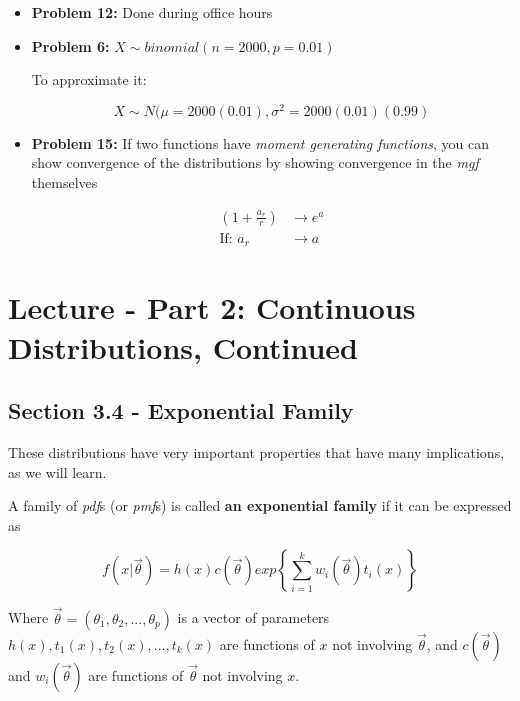 \documentclass{article}
\begin{document}
\begin{itemize}
    \item \textbf{Problem 12:} Done during office hours
    
    \item \textbf{Problem 6:} $X \sim binomial(n=2000,p=0.01)$
    
    To approximate it:
    
    \begin{equation*}
        X \sim N(\mu = 2000(0.01), \sigma^2 = 2000(0.01)(0.99)
    \end{equation*}
    
    \item \textbf{Problem 15:} If two functions have \textit{moment generating functions}, you can show convergence of the distributions by showing convergence in the \textit{mgf} themselves
    
    \begin{equation*}
        \begin{split}
            \left(1 + \frac{a_r}{r} \right) &\to e^a\\
           \text{If: } a_r &\to a
        \end{split}
    \end{equation*}
    
    \end{itemize}
    
    

\section{Lecture - Part 2: Continuous Distributions, Continued}

\subsection{Section 3.4 - Exponential Family}

These distributions have very important properties that have many implications, as we will learn.

A family of \textit{pdf}s (or \textit{pmf}s) is called \textbf{an exponential family} if it can be expressed as 

\begin{equation*}
    f(x|\overrightarrow{\theta}) = h(x) c(\overrightarrow{\theta}) exp\left\{ \sum_{i=1}^k w_i\left(\overrightarrow{\theta}\right)t_i(x) \right\}
\end{equation*}

Where $\overrightarrow{\theta} = (\theta_1, \theta_2,...,\theta_p)$ is a vector of parameters $h(x),t_1(x),t_2(x),...,t_k(x)$ are functions of $x$ not involving $\overrightarrow{\theta}$, and $c(\overrightarrow{\theta})$ and $w_i(\overrightarrow{\theta})$ are functions of $\overrightarrow{\theta}$ not involving $x$.
\end{document}
